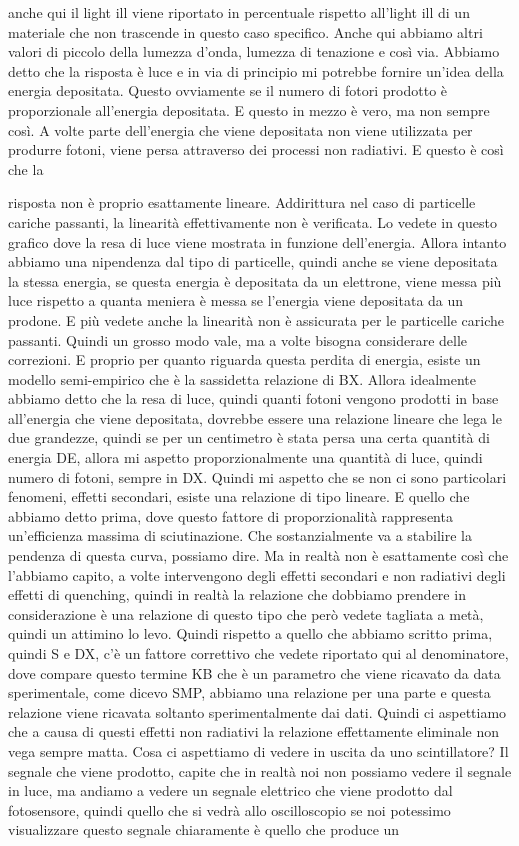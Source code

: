 anche qui il light ill viene riportato in percentuale rispetto all'light ill di un materiale che non trascende in questo caso specifico. Anche qui abbiamo altri valori di piccolo della lumezza d'onda, lumezza di tenazione e così via. Abbiamo detto che la risposta è luce e in via di principio mi potrebbe fornire un'idea della energia depositata. Questo ovviamente se il numero di fotori prodotto è proporzionale all'energia depositata. E questo in mezzo è vero, ma non sempre così. A volte parte dell'energia che viene depositata non viene utilizzata per produrre fotoni, viene persa attraverso dei processi non radiativi. E questo è così che la 

risposta non è proprio esattamente lineare. Addirittura nel caso di particelle cariche passanti, la linearità effettivamente non è verificata. Lo vedete in questo grafico dove la resa di luce viene mostrata in funzione dell'energia. Allora intanto abbiamo una nipendenza dal tipo di particelle, quindi anche se viene depositata la stessa energia, se questa energia è depositata da un elettrone, viene messa più luce rispetto a quanta meniera è messa se l'energia viene depositata da un prodone. E più vedete anche la linearità non è assicurata per le particelle cariche passanti. Quindi un grosso modo vale, ma a volte bisogna considerare delle correzioni. E proprio per quanto riguarda questa perdita di energia, esiste un modello semi-empirico che è la sassidetta relazione di BX. Allora idealmente abbiamo detto che la resa di luce, quindi quanti fotoni vengono prodotti in base all'energia che viene depositata, dovrebbe essere una relazione lineare che lega le due grandezze, quindi se per un centimetro è stata persa una certa quantità di energia DE, allora mi aspetto proporzionalmente una quantità di luce, quindi numero di fotoni, sempre in DX. Quindi mi aspetto che se non ci sono particolari fenomeni, effetti secondari, esiste una relazione di tipo lineare. E quello che abbiamo detto prima, dove questo fattore di proporzionalità rappresenta un'efficienza massima di sciutinazione. Che sostanzialmente va a stabilire la pendenza di questa curva, possiamo dire. Ma in realtà non è esattamente così che l'abbiamo capito, a volte intervengono degli effetti secondari e non radiativi degli effetti di quenching, quindi in realtà la relazione che dobbiamo prendere in considerazione è una relazione di questo tipo che però vedete tagliata a metà, quindi un attimino lo levo. Quindi rispetto a quello che abbiamo scritto prima, quindi S e DX, c'è un fattore correttivo che vedete riportato qui al denominatore, dove compare questo termine KB che è un parametro che viene ricavato da data sperimentale, come dicevo SMP, abbiamo una relazione per una parte e questa relazione viene ricavata soltanto sperimentalmente dai dati. Quindi ci aspettiamo che a causa di questi effetti non radiativi la relazione effettamente eliminale non vega sempre matta. Cosa ci aspettiamo di vedere in uscita da uno scintillatore? Il segnale che viene prodotto, capite che in realtà noi non possiamo vedere il segnale in luce, ma andiamo a vedere un segnale elettrico che viene prodotto dal fotosensore, quindi quello che si vedrà allo oscilloscopio se noi potessimo visualizzare questo segnale chiaramente è quello che produce un 